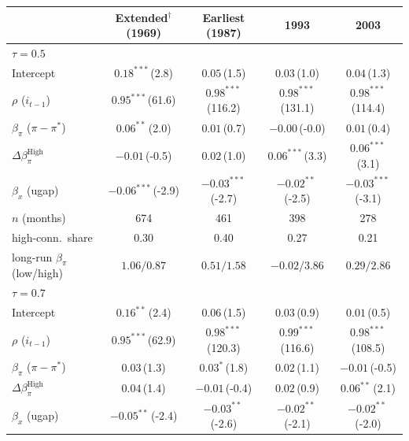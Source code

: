 \setlength{\tabcolsep}{4pt}\scriptsize
\begin{tabular}{lcccc}
\toprule
 & Extended$^{\dagger}$ (1969) & Earliest (1987) & 1993 & 2003 \\
\midrule
\multicolumn{5}{l}{\textit{$\tau=0.5$}} \\
Intercept & $0.18^{***}$\,{\scriptsize(2.8)} & $0.05$\,{\scriptsize(1.5)} & $0.03$\,{\scriptsize(1.0)} & $0.04$\,{\scriptsize(1.3)} \\
$\rho$ ($i_{t-1}$) & $0.95^{***}$\,{\scriptsize(61.6)} & $0.98^{***}$\,{\scriptsize(116.2)} & $0.98^{***}$\,{\scriptsize(131.1)} & $0.98^{***}$\,{\scriptsize(114.4)} \\
$\beta_\pi$ ($\pi-\pi^*$) & $0.06^{**}$\,{\scriptsize(2.0)} & $0.01$\,{\scriptsize(0.7)} & $-0.00$\,{\scriptsize(-0.0)} & $0.01$\,{\scriptsize(0.4)} \\
$\Delta\beta_\pi^{\text{High}}$ & $-0.01$\,{\scriptsize(-0.5)} & $0.02$\,{\scriptsize(1.0)} & $0.06^{***}$\,{\scriptsize(3.3)} & $0.06^{***}$\,{\scriptsize(3.1)} \\
$\beta_x$ (ugap) & $-0.06^{***}$\,{\scriptsize(-2.9)} & $-0.03^{***}$\,{\scriptsize(-2.7)} & $-0.02^{**}$\,{\scriptsize(-2.5)} & $-0.03^{***}$\,{\scriptsize(-3.1)} \\
\addlinespace
$n$ (months) & 674 & 461 & 398 & 278 \\
high-conn.\ share & 0.30 & 0.40 & 0.27 & 0.21 \\
long-run $\beta_\pi$ (low/high) & $1.06/0.87$ & $0.51/1.58$ & $-0.02/3.86$ & $0.29/2.86$ \\
\midrule
\multicolumn{5}{l}{\textit{$\tau=0.7$}} \\
Intercept & $0.16^{**}$\,{\scriptsize(2.4)} & $0.06$\,{\scriptsize(1.5)} & $0.03$\,{\scriptsize(0.9)} & $0.01$\,{\scriptsize(0.5)} \\
$\rho$ ($i_{t-1}$) & $0.95^{***}$\,{\scriptsize(62.9)} & $0.98^{***}$\,{\scriptsize(120.3)} & $0.99^{***}$\,{\scriptsize(116.6)} & $0.98^{***}$\,{\scriptsize(108.5)} \\
$\beta_\pi$ ($\pi-\pi^*$) & $0.03$\,{\scriptsize(1.3)} & $0.03^{*}$\,{\scriptsize(1.8)} & $0.02$\,{\scriptsize(1.1)} & $-0.01$\,{\scriptsize(-0.5)} \\
$\Delta\beta_\pi^{\text{High}}$ & $0.04$\,{\scriptsize(1.4)} & $-0.01$\,{\scriptsize(-0.4)} & $0.02$\,{\scriptsize(0.9)} & $0.06^{**}$\,{\scriptsize(2.1)} \\
$\beta_x$ (ugap) & $-0.05^{**}$\,{\scriptsize(-2.4)} & $-0.03^{**}$\,{\scriptsize(-2.6)} & $-0.02^{**}$\,{\scriptsize(-2.1)} & $-0.02^{**}$\,{\scriptsize(-2.0)} \\

\end{tabular}
